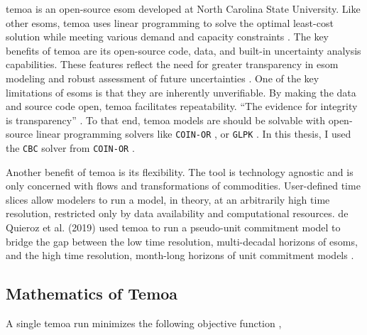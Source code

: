 \gls{temoa} is an open-source \gls{esom} developed at North Carolina State University.
Like other \glspl{esom}, \gls{temoa} uses linear programming to solve the optimal
least-cost solution while meeting various demand and capacity constraints \cite{hunter_modeling_2013}.
The key benefits of \gls{temoa} are its open-source code, data, and built-in
uncertainty analysis capabilities. These features reflect the need for greater
transparency in \gls{esom} modeling and robust assessment of future uncertainties
\cite{hunter_modeling_2013}. One of the key limitations of \glspl{esom} is that
they are inherently unverifiable. By making the data and source code open,
\gls{temoa} facilitates repeatability. ``The evidence for integrity is transparency''
\cite{decarolis_case_2012}. To that end, \gls{temoa} models are should be solvable
with open-source linear programming solvers like \texttt{COIN-OR} \cite{noauthor_coin-or_nodate},
or \texttt{GLPK} \cite{noauthor_glpk_nodate}. In this thesis, I used the \texttt{CBC}
solver from \texttt{COIN-OR} \cite{noauthor_cbc_2021}.

Another benefit of \gls{temoa} is its flexibility.
The tool is technology agnostic and is only concerned with flows and transformations
of commodities. User-defined time slices allow modelers to run a model, in theory,
at an arbitrarily high time resolution, restricted only by data availability and
computational resources. de Quieroz et al. (2019) used \gls{temoa} to run a
pseudo-unit commitment model to bridge the gap between the low time resolution,
multi-decadal horizons of \glspl{esom}, and the high time resolution, month-long
horizons of unit commitment models \cite{de_queiroz_repurposing_2019}.

\subsection{Mathematics of Temoa}

A single \gls{temoa} run minimizes the following objective function \cite{noauthor_preface_nodate},

